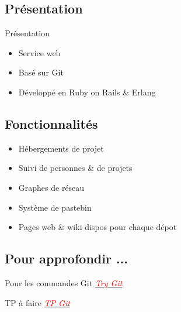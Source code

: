 \begin{frame}
	\sectionpage
\end{frame}

\subsection{Présentation}
	\begin{frame}{Présentation}
		\begin{itemize}[<+->]
			\item Service web
			\item Basé sur Git
			\item Développé en Ruby on Rails \& Erlang
		\end{itemize}
	\end{frame}

\subsection{Fonctionnalités}
	\begin{frame}
		\begin{itemize}[<+->]
			\item Hébergements de projet
			\item Suivi de personnes \& de projets
			\item Graphes de réseau
			\item Système de pastebin
			\item Pages web \& wiki dispos pour chaque dépot
		\end{itemize}
	\end{frame}
	
\subsection{Pour approfondir ...}
	\begin{frame}
		\begin{block}{Pour les commandes Git}
			\href{http://try.github.io/}{\textit{\textcolor{red}{Try Git}}}
		\end{block}
		\begin{block}{TP à faire}
			\href{http://bit.ly/iut-3}{\textit{\textcolor{red}{TP Git}}}
		\end{block}
	\end{frame}
